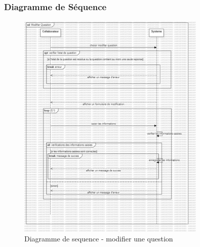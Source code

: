 \documentclass{article}
\begin{document}
            \subsubsection{Diagramme de Séquence}
            \begin{figure}[h!]
                \centering
                \includegraphics[width=0.8\textwidth]{assets/diagrammes/sequenceDiagram.jpg}
                \caption{Diagramme de sequence - modifier une question}
            \end{figure}
            \FloatBarrier
\end{document}
